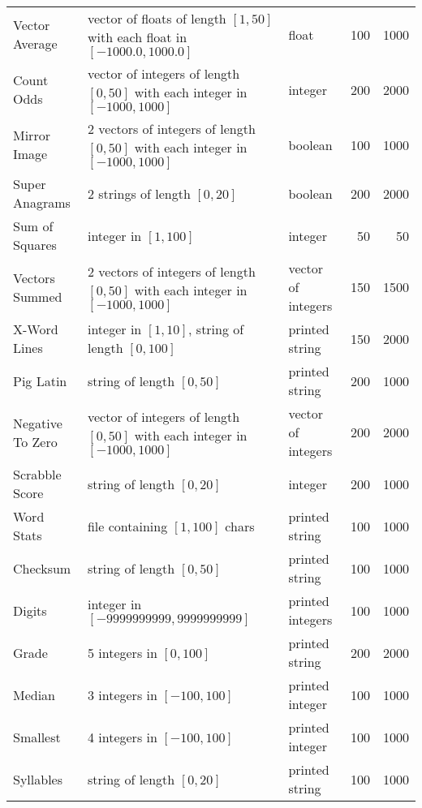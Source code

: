\documentclass{sig-alternate}
\begin{document}
\begin{table*}[t]
\begin{tabular}{>{\raggedright}p{3.5cm}  >{\raggedright}p{7.4cm} l rr}
Vector Average & vector of floats of length $[1,50]$ with each float in $[-1000.0, 1000.0]$ & float & 100 & 1000 \\
Count Odds & vector of integers of length $[0,50]$ with each integer in $[-1000, 1000]$ & integer & 200 & 2000 \\
Mirror Image & 2 vectors of integers of length $[0,50]$ with each integer in $[-1000, 1000]$ & boolean & 100 & 1000 \\
Super Anagrams & 2 strings of length $[0, 20]$ & boolean & 200 & 2000 \\
Sum of Squares & integer in $[1, 100]$ & integer & 50 & 50 \\
Vectors Summed & 2 vectors of integers of length $[0,50]$ with each integer in $[-1000, 1000]$ & vector of integers & 150 & 1500 \\
X-Word Lines & integer in $[1, 10]$, string of length $[0, 100]$ & printed string & 150 & 2000 \\
Pig Latin & string of length $[0, 50]$ & printed string & 200 & 1000 \\
Negative To Zero & vector of integers of length $[0,50]$ with each integer in $[-1000, 1000]$ & vector of integers & 200 & 2000 \\
Scrabble Score & string of length $[0, 20]$ & integer & 200 & 1000 \\
Word Stats & file containing $[1, 100]$ chars & printed string & 100 & 1000 \\
Checksum & string of length $[0, 50]$ & printed string & 100 & 1000 \\
Digits & integer in $[-9999999999, 9999999999]$ & printed integers & 100 & 1000 \\
Grade & 5 integers in $[0, 100]$ & printed string & 200 & 2000 \\
Median & 3 integers in $[-100, 100]$ & printed integer & 100 & 1000 \\
Smallest & 4 integers in $[-100, 100]$ & printed integer & 100 & 1000 \\
Syllables & string of length $[0, 20]$ & printed string & 100 & 1000\\
\bottomrule
\end{tabular}
\end{table*}

\end{document}
